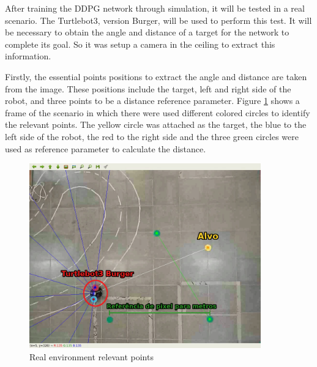 
After training the DDPG network through simulation, it will be tested in a real scenario.
The Turtlebot3, version Burger, will be used to perform this test.
It will be necessary to obtain the angle and distance of a target for the network to complete its goal.
So it was setup a camera in the ceiling to extract this information.

Firstly, the essential points positions to extract the angle and distance are taken from the image.
These positions include the target, left and right side of the robot, and three points to be a distance reference parameter.
Figure \ref{fig:pixel_to_meter} shows a frame of the scenario in which there were used different colored circles to identify the relevant points.
The yellow circle was attached as the target, the blue to the left side of the robot, the red to the right side and the three green circles were used as reference parameter to calculate the distance.

\begin{figure}[H]
\centerline{\includegraphics[width=10cm]{imagens/pixel_to_meter.png}}
\caption{Real environment relevant points}
\label{fig:pixel_to_meter}
\end{figure}


